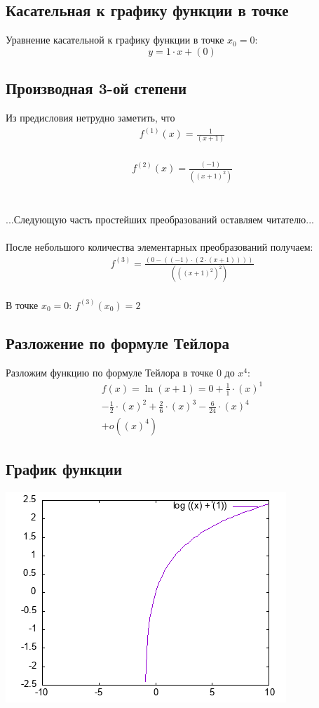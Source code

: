 \documentclass[a4paper,12pt]{article} %
\begin{document}
\subsection{Касательная к графику функции в точке} 
 Уравнение касательной к графику функции в точке $x_0 = 0$:\[ y = 1 \cdot x + (0)\]
\subsection{Производная 3-ой степени} 
 Из предисловия нетрудно заметить, что 
\begin{eqnarray}
 f^{(1)}(x) =  \frac {{1}}{({x} + {{1}})}\end{eqnarray}\\
\begin{eqnarray}
 f^{(2)}(x) =  \frac {{(-1)}}{({({x} + {{1}})} ^ {{2}})}\end{eqnarray}\\
\\...Следующую часть простейших преобразований оставляем читателю...\\\\После небольшого количества элементарных преобразований получаем:\\ 
\begin{eqnarray} 
f^{(3)} =  \frac {({{0}} - {({{(-1)}} \cdot {({{2}} \cdot {({x} + {{1}})})})})}{({({({x} + {{1}})} ^ {{2}})} ^ {{2}})}\end{eqnarray} 
\\В точке $x_0 = 0$:  $f^{(3)}(x_0) = 2$
\subsection{Разложение по формуле Тейлора} 
 Разложим функцию по формуле Тейлора в точке $0$ до $x^{4}$: 
\begin{eqnarray}
f(x) = \ln {({x} + {{1}})} = 0 + \frac{1}{1} \cdot (x)^{1}\nonumber\\ 
 - \frac{1}{2} \cdot (x)^{2} + \frac{2}{6} \cdot (x)^{3} - \frac{6}{24} \cdot (x)^{4}\nonumber\\ 
 + o((x)^{4})\end{eqnarray}
\subsection{График функции} 
 \includegraphics{graphic.png}\\
\end{document}
